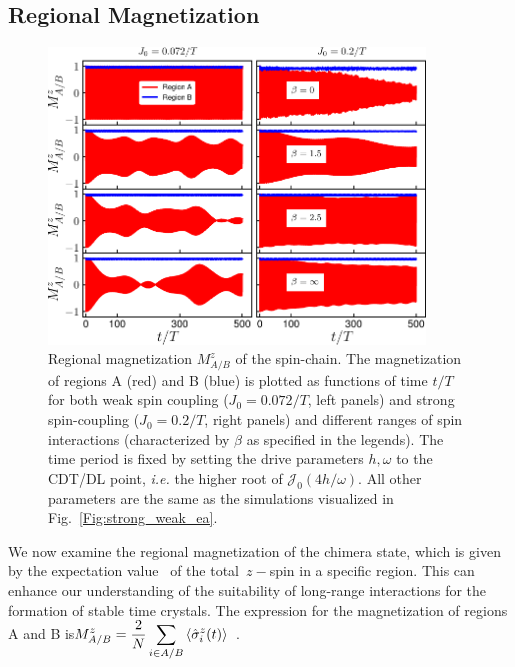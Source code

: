 \documentclass[12pt]{iopart}
\begin{document}
\subsection{\label{sec:level42} Regional Magnetization}
\begin{figure}[t!]
	\centering
	\includegraphics[width = 10cm]{clean_J_strong_MzAB_betas.pdf}
	\caption{Regional magnetization $M^z_{A/B}$ of the spin-chain. The magnetization of regions A (red) and B (blue) is plotted as functions of time $t/T$ for both weak spin coupling ($J_0=0.072/T$, left panels) and strong spin-coupling ($J_0=0.2/T$, right panels) and different ranges of spin interactions (characterized by $\beta$ as specified in the legends). The time period is fixed by setting the drive parameters $h,\omega$ to the CDT/DL point, \textit{i.e.} the higher root of $\mathcal{J}_0(4h/\omega)$. All other parameters are the same as the simulations visualized in Fig.~\ref{Fig:strong_weak_ea}.}
	\label{Fig:regiogionalmag}
\end{figure}
We now examine the regional magnetization of the chimera state, which is given by the expectation value  of the total $z-$spin in a specific region. This can enhance our understanding of the suitability of long-range interactions for the formation of stable time crystals. The expression for the magnetization of regions A and B is$\displaystyle M^z_{A/B}=\frac{2}{N}\sum_{i\in{A/B}}\expval{\hat{\sigma}^z_i(t)}$~\cite{sakurai_phys_nodate}.
\end{document}
